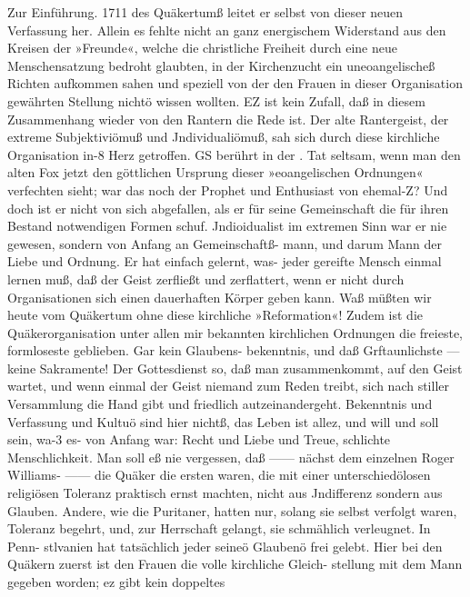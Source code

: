 Zur Einführung. 1711
des Quäkertumß leitet er selbst von dieser neuen Verfassung her.
Allein es fehlte nicht an ganz energischem Widerstand aus den
Kreisen der »Freunde«, welche die christliche Freiheit durch eine
neue Menschensatzung bedroht glaubten, in der Kirchenzucht ein
uneoangelischeß Richten aufkommen sahen und speziell von der
den Frauen in dieser Organisation gewährten Stellung nichtö
wissen wollten. EZ ist kein Zufall, daß in diesem Zusammenhang
wieder von den Rantern die Rede ist. Der alte Rantergeist, der
extreme Subjektiviömuß und Jndividualiömuß, sah sich durch diese
kirchliche Organisation in-8 Herz getroffen. GS berührt in der
. Tat seltsam, wenn man den alten Fox jetzt den göttlichen Ursprung
dieser »eoangelischen Ordnungen« verfechten sieht; war das noch
der Prophet und Enthusiast von ehemal-Z? Und doch ist er nicht
von sich abgefallen, als er für seine Gemeinschaft die für ihren
Bestand notwendigen Formen schuf. Jndioidualist im extremen
Sinn war er nie gewesen, sondern von Anfang an Gemeinschaftß-
mann, und darum Mann der Liebe und Ordnung. Er hat einfach
gelernt, was- jeder gereifte Mensch einmal lernen muß, daß der
Geist zerfließt und zerflattert, wenn er nicht durch Organisationen
sich einen dauerhaften Körper geben kann. Waß müßten wir
heute vom Quäkertum ohne diese kirchliche »Reformation«! Zudem
ist die Quäkerorganisation unter allen mir bekannten kirchlichen
Ordnungen die freieste, formloseste geblieben. Gar kein Glaubens-
bekenntnis, und daß Grftaunlichste — keine Sakramente! Der
Gottesdienst so, daß man zusammenkommt, auf den Geist wartet,
und wenn einmal der Geist niemand zum Reden treibt, sich nach
stiller Versammlung die Hand gibt und friedlich autzeinandergeht.
Bekenntnis und Verfassung und Kultuö sind hier nichtß, das
Leben ist allez, und will und soll sein, wa-3 es- von Anfang war:
Recht und Liebe und Treue, schlichte Menschlichkeit.
Man soll eß nie vergessen, daß —— nächst dem einzelnen
Roger Williams- —— die Quäker die ersten waren, die mit einer
unterschiedölosen religiösen Toleranz praktisch ernst machten, nicht
aus Jndifferenz sondern aus Glauben. Andere, wie die Puritaner,
hatten nur, solang sie selbst verfolgt waren, Toleranz begehrt,
und, zur Herrschaft gelangt, sie schmählich verleugnet. In Penn-
stlvanien hat tatsächlich jeder seineö Glaubenö frei gelebt. Hier
bei den Quäkern zuerst ist den Frauen die volle kirchliche Gleich-
stellung mit dem Mann gegeben worden; ez gibt kein doppeltes


